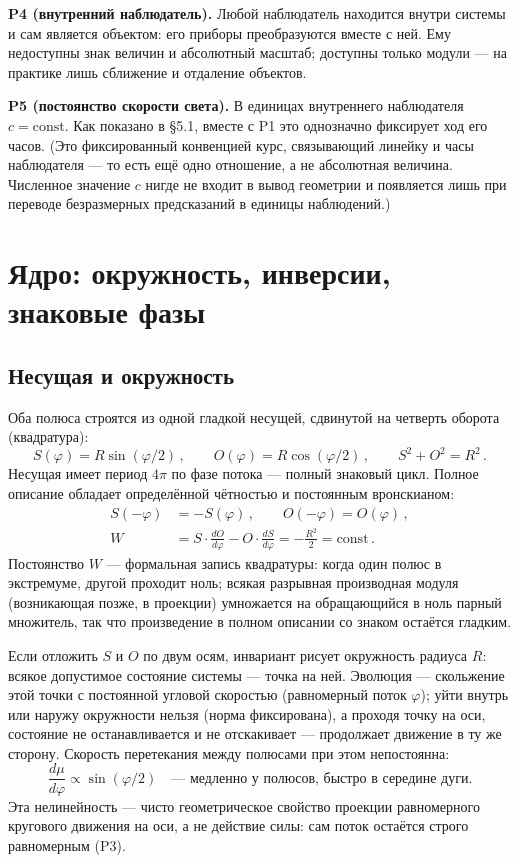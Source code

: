 \documentclass{article}
\begin{document}
\medskip
\noindent\textbf{P4 (внутренний наблюдатель).} Любой наблюдатель находится внутри системы и сам является объектом: его приборы преобразуются вместе с ней. Ему недоступны знак величин и абсолютный масштаб; доступны только модули --- на практике лишь сближение и отдаление объектов.

\medskip
\noindent\textbf{P5 (постоянство скорости света).} В единицах внутреннего наблюдателя $c = \text{const}$. Как показано в \S5.1, вместе с P1 это однозначно фиксирует ход его часов.
(Это фиксированный конвенцией курс, связывающий линейку и часы наблюдателя --- то есть ещё одно отношение, а не абсолютная величина. Численное значение $c$ нигде не входит в вывод геометрии и появляется лишь при переводе безразмерных предсказаний в единицы наблюдений.)

\section{Ядро: окружность, инверсии, знаковые фазы}

\subsection{Несущая и окружность}

Оба полюса строятся из одной гладкой несущей, сдвинутой на четверть оборота (квадратура):
\begin{equation}
S(\varphi) = R\sin(\varphi/2)\,, \qquad O(\varphi) = R\cos(\varphi/2)\,, \qquad S^2 + O^2 = R^2\,.
\end{equation}
Несущая имеет период $4\pi$ по фазе потока --- полный знаковый цикл. Полное описание обладает определённой чётностью и постоянным вронскианом:
\begin{align}
S(-\varphi) &= -S(\varphi)\,, \qquad O(-\varphi) = O(\varphi)\,, \\
W &= S\cdot\frac{dO}{d\varphi} - O\cdot\frac{dS}{d\varphi} = -\frac{R^2}{2} = \text{const}\,.
\end{align}
Постоянство $W$ --- формальная запись квадратуры: когда один полюс в экстремуме, другой проходит ноль; всякая разрывная производная модуля (возникающая позже, в проекции) умножается на обращающийся в ноль парный множитель, так что произведение в полном описании со знаком остаётся гладким.

Если отложить $S$ и $O$ по двум осям, инвариант рисует окружность радиуса $R$: всякое допустимое состояние системы --- точка на ней. Эволюция --- скольжение этой точки с постоянной угловой скоростью (равномерный поток $\varphi$); уйти внутрь или наружу окружности нельзя (норма фиксирована), а проходя точку на оси, состояние не останавливается и не отскакивает --- продолжает движение в ту же сторону. Скорость перетекания между полюсами при этом непостоянна:
\begin{equation}
\frac{d\mu}{d\varphi} \propto \sin(\varphi/2) \quad \text{--- медленно у полюсов, быстро в середине дуги.}
\end{equation}
Эта нелинейность --- чисто геометрическое свойство проекции равномерного кругового движения на оси, а не действие силы: сам поток остаётся строго равномерным (P3).
\end{document}
